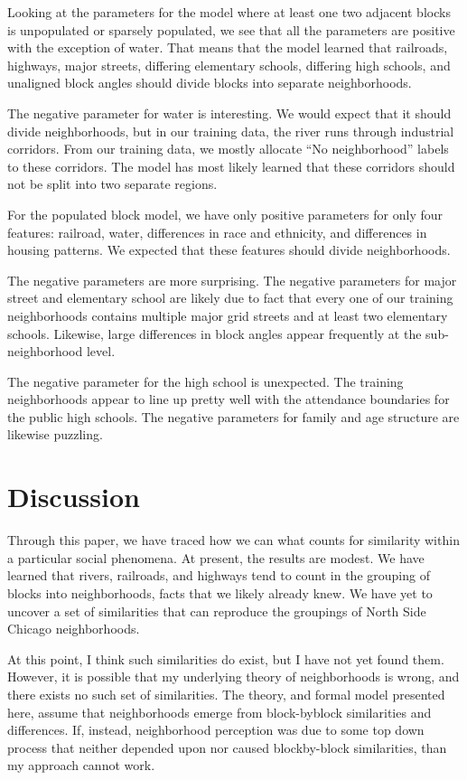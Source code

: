 \documentclass[12pt,letter]{article}\usepackage[]{graphicx}\usepackage[]{color}
\begin{document}
Looking at the parameters for the model where at least one two
adjacent blocks is unpopulated or sparsely populated, we see that all
the parameters are positive with the exception of water. That means
that the model learned that railroads, highways, major streets,
differing elementary schools, differing high schools, and unaligned
block angles should divide blocks into separate neighborhoods.  

The negative parameter for water is interesting. We would expect that
it should divide neighborhoods, but in our training data, the river
runs through industrial corridors. From our training data, we mostly
allocate “No neighborhood” labels to these corridors. The model has
most likely learned that these corridors should not be split into two
separate regions.  

For the populated block model, we have only
positive parameters for only four features: railroad, water,
differences in race and ethnicity, and differences in housing
patterns. We expected that these features should divide neighborhoods.

The negative parameters are more surprising. The negative parameters
for major street and elementary school are likely due to fact that
every one of our training neighborhoods contains multiple major grid
streets and at least two elementary schools. Likewise, large
differences in block angles appear frequently at the sub-neighborhood
level.  

The negative parameter for the high school is unexpected. The
training neighborhoods appear to line up pretty well with the
attendance boundaries for the public high schools. The negative
parameters for family and age structure are likewise puzzling.

\section*{Discussion}
Through this paper, we have traced how we can what counts for similarity
within a particular social phenomena. At present, the results are modest.
We have learned that rivers, railroads, and highways tend to count in the
grouping of blocks into neighborhoods, facts that we likely already knew.
We have yet to uncover a set of similarities that can reproduce the groupings
of North Side Chicago neighborhoods.

At this point, I think such similarities do exist, but I have not yet
found them. However, it is possible that my underlying theory of
neighborhoods is wrong, and there exists no such set of
similarities. The theory, and formal model presented here, assume that
neighborhoods emerge from block-byblock similarities and
differences. If, instead, neighborhood perception was due to some top
down process that neither depended upon nor caused blockby-block
similarities, than my approach cannot work.  
\end{document}
